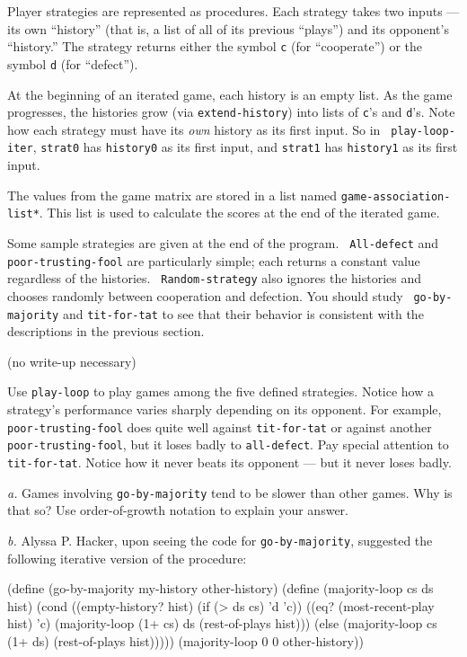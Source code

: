 Player strategies are represented as procedures. Each strategy takes
two inputs --- its own ``history'' (that is, a list of all of its
previous ``plays'') and its opponent's ``history.'' The strategy
returns either the symbol {\tt c} (for ``cooperate'') or the symbol
{\tt d} (for ``defect'').

At the beginning of an iterated game, each history is an empty list.
As the game progresses, the histories grow (via {\tt extend-history})
into lists of {\tt c}'s and {\tt d}'s. Note how each strategy must
have its {\it own} history as its first input. So in {\tt
play-loop-iter}, {\tt strat0} has {\tt history0} as its first input,
and {\tt strat1} has {\tt history1} as its first input.

The values from the game matrix are stored in a list named
{\tt *game-association-list*}. This list is used to calculate the scores at
the end of the iterated game.

Some sample strategies are given at the end of the program. {\tt
All-defect} and {\tt poor-trusting-fool} are particularly simple; each
returns a constant value regardless of the histories. {\tt
Random-strategy} also ignores the histories and chooses randomly
between cooperation and defection. You should study {\tt 
go-by-majority} and {\tt tit-for-tat} to see that their behavior is
consistent with the descriptions in the previous section.

\vskip 8pt

 (no write-up necessary)

Use {\tt play-loop} to play games among the five defined strategies.
Notice how a strategy's performance varies sharply depending on its
opponent.  For example, {\tt poor-trusting-fool} does quite well
against {\tt tit-for-tat} or against another {\tt poor-trusting-fool},
but it loses badly to {\tt all-defect}.  Pay special attention to {\tt
tit-for-tat}. Notice how it never beats its opponent --- but it never
loses badly.

\vskip 8pt


{\it a.} Games involving {\tt go-by-majority} tend to be slower than
other games. Why is that so? Use order-of-growth notation to explain
your answer.

{\it b.} Alyssa P. Hacker, upon seeing the code for {\tt go-by-majority},
suggested the following iterative version of the procedure:

\beginlisp
(define (go-by-majority my-history other-history)
  (define (majority-loop cs ds hist)
    (cond ((empty-history? hist) (if (> ds cs) 'd 'c))
          ((eq? (most-recent-play hist) 'c)
           (majority-loop (1+ cs) ds (rest-of-plays hist)))
          (else
           (majority-loop cs (1+ ds) (rest-of-plays hist)))))
  (majority-loop 0 0 other-history))
\endlisp


